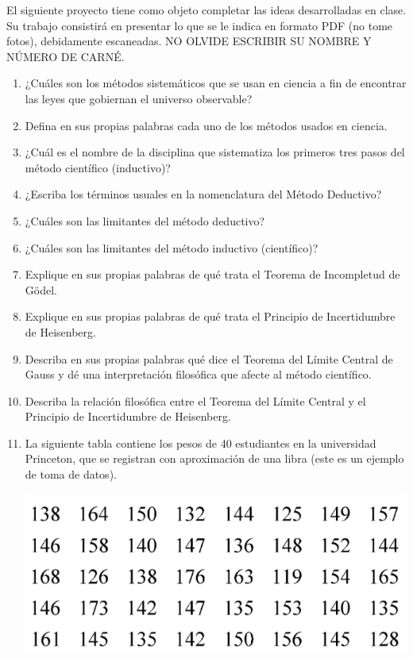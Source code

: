 





El siguiente proyecto tiene como objeto completar las ideas desarrolladas en clase. Su trabajo consistirá en presentar lo que se le indica en formato PDF (no tome fotos), debidamente escaneadas. NO OLVIDE ESCRIBIR SU NOMBRE Y NÚMERO DE CARNÉ. 

\begin{enumerate}
	\item ¿Cuáles son los métodos sistemáticos que se usan en ciencia a fin de encontrar las leyes que gobiernan el universo observable?
	
	\item Defina en sus propias palabras cada uno de los métodos usados en ciencia.
	
	\item ¿Cuál es el nombre de la disciplina que sistematiza los primeros tres pasos del método científico (inductivo)?
	
	\item ¿Escriba los términos usuales en la nomenclatura del Método Deductivo?
	
	\item ¿Cuáles son las limitantes del método deductivo?
	
	\item ¿Cuáles son las limitantes del método inductivo (científico)?
	
	\item Explique en sus propias palabras de qué trata el Teorema de Incompletud de Gödel.
	
	\item Explique en sus propias palabras de qué trata el Principio de Incertidumbre de Heisenberg.
	
	\item Describa en sus propias palabras qué dice el Teorema del Límite Central de Gauss y dé una interpretación filosófica que afecte al método científico.
	
	\item Describa la relación filosófica entre el Teorema del Límite Central y el Principio de Incertidumbre de Heisenberg. 
	
	\item La siguiente tabla contiene los pesos de 40 estudiantes en la universidad Princeton, que se registran con aproximación de una libra (este es un ejemplo de toma de datos).
	\begin{center}
		\includegraphics[scale=0.4]{images/1}
	\end{center}


\end{enumerate}

